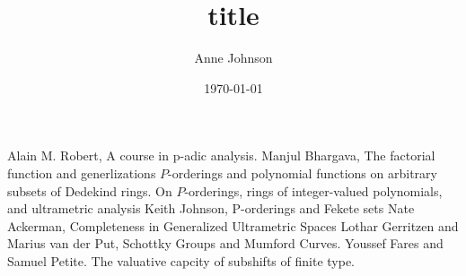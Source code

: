 \documentclass[12pt]{report}
\title{title}
\author{Anne Johnson}
\date{\today}
\theoremstyle{definition}
\begin{document}



%
%

%
%
%


%
%

%	
\begin{thebibliography}{1}
 Alain M. Robert, A course in p-adic analysis.
 Manjul Bhargava, The factorial function and generlizations
 $P$-orderings and polynomial functions on arbitrary subsets of Dedekind rings.
 On $ P$-orderings, rings of integer-valued polynomials, and ultrametric analysis
 Keith Johnson, P-orderings and Fekete sets
 Nate Ackerman,  Completeness in Generalized Ultrametric Spaces
 Lothar Gerritzen and Marius van der Put, Schottky Groups and Mumford Curves.
 Youssef Fares and Samuel Petite. The valuative capcity of subshifts of finite type.
\end{thebibliography}
\end{document}
